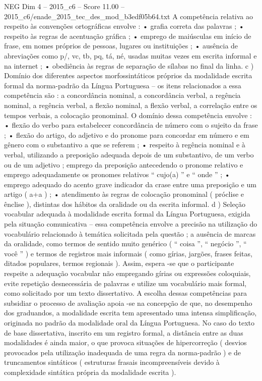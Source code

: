 \begin{textsample}{NEG Dim 4 – 2015\_c6 – Score 11.00 – 2015\_c6/enade\_2015\_tec\_des\_mod\_b3edf05b64.txt}
A competência relativa ao respeito às convenções ortográficas envolve : • grafia correta das palavras ; • respeito às regras de acentuação gráfica ; • emprego de maiúsculas em início de frase, em nomes próprios de pessoas, lugares ou instituições ; • ausência de abreviações como p/, vc, tb, pq, tá, né, usadas muitas vezes em escrita informal e na internet ; • obediência às regras de separação de sílabas no final da linha. c ) Domínio dos diferentes aspectos morfossintáticos próprios da modalidade escrita formal da norma-padrão da Língua Portuguesa – os itens relacionados a essa competência são : a concordância nominal, a concordância verbal, a regência nominal, a regência verbal, a flexão nominal, a flexão verbal, a correlação entre os tempos verbais, a colocação pronominal.
O domínio dessa competência envolve : • flexão do verbo para estabelecer concordância de número com o sujeito da frase ; • flexão do artigo, do adjetivo e do pronome para concordar em número e em gênero com o substantivo a que se referem ; • respeito à regência nominal e à verbal, utilizando a preposição adequada depois de um substantivo, de um verbo ou de um adjetivo ; emprego da preposição antecedendo o pronome relativo e emprego adequadamente os pronomes relativos “ cujo(a) ” e “ onde ” ; • emprego adequado do acento grave indicador da crase entre uma preposição e um artigo ( a+a ) ; • atendimento às regras de colocação pronominal ( próclise e ênclise ), distintas dos hábitos da oralidade ou da escrita informal. d ) Seleção vocabular adequada à modalidade escrita formal da Língua Portuguesa, exigida pela situação comunicativa – essa competência envolve a precisão na utilização do vocabulário relacionado à temática solicitada pela questão ; a ausência de marcas da oralidade, como termos de sentido muito genérico ( “ coisa ”, “ negócio ”, “ você ” ) e termos de registros mais informais ( como gírias, jargões, frases feitas, ditados populares, termos regionais ).
Assim, espera -se que o participante respeite a adequação vocabular não empregando gírias ou expressões coloquiais, evite repetição desnecessária de palavras e utilize um vocabulário mais formal, como solicitado por um texto dissertativo.
A escolha dessas competências para subsidiar o processo de avaliação apoia -se na concepção de que, no desempenho dos graduandos, a modalidade escrita tem apresentado uma intensa simplificação, originada no padrão da modalidade oral da Língua Portuguesa.
No caso do texto de base dissertativa, inscrito em um registro formal, a distância entre as duas modalidades é ainda maior, o que provoca situações de hipercorreção ( desvios provocados pela utilização inadequada de uma regra da norma-padrão ) e de truncamentos sintáticos ( estruturas frasais incompreensíveis devido à complexidade sintática própria da modalidade escrita ).

\end{textsample}
